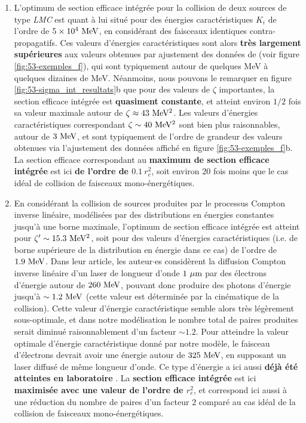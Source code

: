 \begin{refsection}
\begin{enumerate}[label={\Roman*. }]
    \item L'optimum de section efficace intégrée pour la collision de deux sources de type \textit{LMC} est quant à lui situé pour des énergies caractéristiques $K_i$ de l'ordre de $5 \times 10^{4} ~ \rm MeV$, en considérant des faisceaux identiques contra-propagatifs. Ces valeurs d'énergies caractéristiques sont alors \textbf{très largement supérieures} aux valeurs obtenues par ajustement des données de \cite{wang_2020} (voir figure \ref{fig:53-exemples_f}), qui sont typiquement autour de quelques MeV à quelques dizaines de MeV. Néanmoins, nous pouvons le remarquer en figure \ref{fig:53-sigma_int_resultats}b que pour des valeurs de $\zeta$ importantes, la section efficace intégrée est \textbf{quasiment constante}, et atteint environ $1/2$ fois sa valeur maximale autour de $\zeta \approx 43 ~ \rm MeV^2$. Les valeurs d'énergies caractéristiques correspondant $\zeta \sim 40 ~ \rm MeV^2$ sont bien plus raisonnables, autour de $3 ~ \rm MeV$, et sont typiquement de l'ordre de grandeur des valeurs obtenues via l'ajustement des données affiché en figure \ref{fig:53-exemples_f}b. La section efficace correspondant au \textbf{maximum de section efficace intégrée} est ici \textbf{de l'ordre de $0.1 ~ r_e^2$}, soit environ $20$ fois moins que le cas idéal de collision de faisceaux mono-énergétiques.
    
    \item En considérant la collision de sources produites par le processus Compton inverse linéaire, modélisées par des distributions en énergies constantes jusqu'à une borne maximale, l'optimum de section efficace intégrée est atteint pour $\zeta' \sim 15.3 ~ \rm MeV^2$, soit pour des valeurs d'énergies caractéristiques (i.e. de borne supérieure de la distribution en énergie dans ce cas) de l'ordre de $1.9 ~ \rm MeV$. Dans leur article, les auteur$\cdot$es \cite{drebot_2017a} considèrent la diffusion Compton inverse linéaire d'un laser de longueur d'onde $1 ~ \rm \mu m$ par des électrons d'énergie autour de $260 ~ \rm MeV$, pouvant donc produire des photons d'énergie jusqu'à $\sim 1.2 ~ \rm MeV$ (cette valeur est déterminée par la cinématique de la collision). Cette valeur d'énergie caractéristique semble alors très légèrement sous-optimale, et dans notre modélisation le nombre total de paires produites serait diminué raisonnablement d'un facteur $\sim 1.2$. Pour atteindre la valeur optimale d'énergie caractéristique donné par notre modèle, le faisceau d'électrons devrait avoir une énergie autour de $325 ~ \rm MeV$, en supposant un laser diffusé de même longueur d'onde. Ce type d'énergie a ici aussi \textbf{déjà été atteintes en laboratoire} \parencite{albert_2016}. La \textbf{section efficace intégrée} est ici \textbf{maximisée avec une valeur de l'ordre de $r_e^2$}, et correspond ici aussi à une réduction du nombre de paires d'un facteur $2$ comparé au cas idéal de la collision de faisceaux mono-énergétiques.
\end{enumerate}


\end{refsection}
